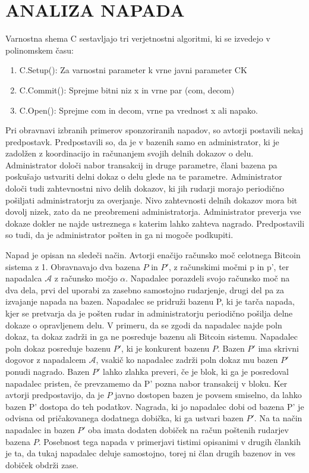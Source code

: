 \documentclass{acm_proc_article-sp}
\begin{document}
\section{ANALIZA NAPADA}

\newline
\indent Varnostna shema C sestavljajo tri verjetnostni algoritmi, ki se izvedejo v polinomskem času:
\begin{enumerate}
\item C.Setup(): Za varnostni parameter k vrne javni parameter CK
\item C.Commit(): Sprejme bitni niz x in vrne par (com, decom)
\item C.Open(): Sprejme com in decom, vrne pa vrednost x ali napako.
\end{enumerate}

Pri obravnavi izbranih primerov sponzoriranih napadov, so avtorji postavili nekaj predpostavk. Predpostavili so, da je v bazenih samo en administrator, ki je zadolžen z koordinacijo in računanjem svojih delnih dokazov o delu. Administrator določi nabor transakcij in druge parametre, člani bazena pa poskušajo ustvariti  delni dokaz o delu glede na te parametre. Administrator določi tudi zahtevnostni nivo delih dokazov, ki jih rudarji morajo periodično pošiljati administratorju za overjanje. Nivo zahtevnosti delnih dokazov mora bit dovolj nizek, zato da ne preobremeni administratorja. Administrator preverja vse dokaze dokler ne najde ustreznega s katerim lahko zahteva nagrado. Predpostavili so tudi, da je administrator pošten in ga ni mogoče podkupiti.

Napad je opisan na sledeči način. Avtorji enačijo računsko moč celotnega Bitcoin sistema z 1. Obravnavajo dva bazena $P$ in $P'$, z računskimi močmi p in p', ter napadalca $\mathcal{A}$ z računsko močjo $\alpha$. Napadalec porazdeli svojo računsko moč na dva dela, prvi del uporabi za zasebno samostojno rudarjenje, drugi del pa za izvajanje napada na bazen. Napadalec se pridruži bazenu P, ki je tarča napada, kjer se pretvarja da je pošten rudar in administratorju periodično pošilja delne dokaze o opravljenem delu. V primeru, da se zgodi da napadalec najde poln dokaz, ta dokaz zadrži in ga ne posreduje bazenu ali Bitcoin sistemu.
Napadalec poln dokaz posreduje bazenu $P'$, ki je konkurent bazenu $P$. Bazen $P'$ ima skrivni dogovor z napadalcem $\mathcal{A}$, vsakič ko napadalec zadrži poln dokaz mu bazen $P'$ ponudi nagrado. Bazen $P'$ lahko zlahka preveri, če je blok, ki ga je posredoval napadalec pristen, če prevzamemo da P' pozna nabor transakcij v bloku. Ker avtorji predpostavijo, da je $P$ javno dostopen bazen je povsem smiselno, da lahko bazen P' dostopa do teh podatkov. Nagrada, ki jo napadalec dobi od bazena P' je odvisna od pričakovanega dodatnega dobička, ki ga ustvari bazen $P'$. Na ta način napadalec in bazen $P'$ oba imata dodaten dobiček na račun poštenih rudarjev bazena $P$. Posebnost tega napada v primerjavi tistimi opisanimi v drugih člankih je ta, da tukaj napadalec deluje samostojno, torej ni član drugih bazenov in ves dobiček obdrži zase.
\end{document}

